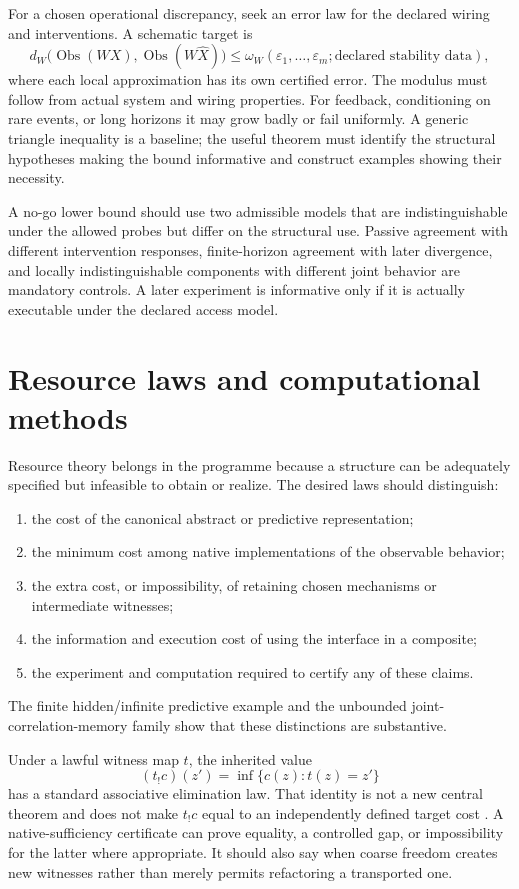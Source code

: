 \documentclass[11pt]{article}
\theoremstyle{remark}
\newcommand{\Obs}{\operatorname{Obs}}
\begin{document}
For a chosen operational discrepancy, seek an error law for the declared wiring and interventions. A schematic target is
\[
 d_W\bigl(\Obs(WX),\Obs(W\widehat X)\bigr)
 \leq \omega_W(\varepsilon_1,\ldots,\varepsilon_m;\text{declared stability data}),
\]
where each local approximation has its own certified error. The modulus must follow from actual system and wiring properties. For feedback, conditioning on rare events, or long horizons it may grow badly or fail uniformly. A generic triangle inequality is a baseline; the useful theorem must identify the structural hypotheses making the bound informative and construct examples showing their necessity.

A no-go lower bound should use two admissible models that are indistinguishable under the allowed probes but differ on the structural use. Passive agreement with different intervention responses, finite-horizon agreement with later divergence, and locally indistinguishable components with different joint behavior are mandatory controls. A later experiment is informative only if it is actually executable under the declared access model.

\section{Resource laws and computational methods}
\label{sec:resources}

Resource theory belongs in the programme because a structure can be adequately specified but infeasible to obtain or realize. The desired laws should distinguish:
\begin{enumerate}
\item the cost of the canonical abstract or predictive representation;
\item the minimum cost among native implementations of the observable behavior;
\item the extra cost, or impossibility, of retaining chosen mechanisms or intermediate witnesses;
\item the information and execution cost of using the interface in a composite;
\item the experiment and computation required to certify any of these claims.
\end{enumerate}
The finite hidden/infinite predictive example and the unbounded joint-correlation-memory family show that these distinctions are substantive.

Under a lawful witness map $t$, the inherited value
\[
 (t_!c)(z')=\inf\{c(z):t(z)=z'\}
\]
has a standard associative elimination law. That identity is not a new central theorem and does not make $t_!c$ equal to an independently defined target cost \cite{Interface,Variational,SteinSamuelson}. A native-sufficiency certificate can prove equality, a controlled gap, or impossibility for the latter where appropriate. It should also say when coarse freedom creates new witnesses rather than merely permits refactoring a transported one.
\end{document}
